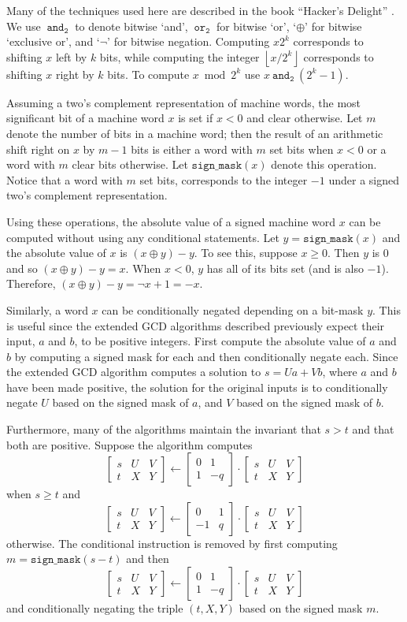 \documentclass{ucalgthes1}
\theoremstyle{definition}
\newcommand{\matrixtt}[4]{\left[ \begin{array}{rr} #1 & #2 \\ #3 & #4 \end{array} \right]}
\newcommand{\matrixThreeTwo}[6]{\left[ \begin{array}{rrr} #1 & #2 & #3 \\ #4 & #5 & #6 \end{array} \right]}
\newcommand{\floor}[1]{\left\lfloor #1 \right\rfloor}
\newcommand{\band}{~\texttt{and}_\texttt{2}~}
\newcommand{\bor}{~\texttt{or}_\texttt{2}~}
\newcommand{\bxor}{\oplus}
\newcommand{\bnot}{\lnot}
\begin{document}
Many of the techniques used here are described in the book ``Hacker's Delight'' \cite{Warren2002}.  We use $\band$ to denote bitwise `and', $\bor$ for bitwise `or', `$\bxor$' for bitwise `exclusive or', and `$\bnot$' for bitwise negation.  Computing $x2^k$ corresponds to shifting $x$ left by $k$ bits, while computing the integer $\floor{x / 2^k}$ corresponds to shifting $x$ right by $k$ bits.  To compute $x \bmod 2^k$ use $x \band (2^k-1)$.

Assuming a two's complement representation of machine words, the most significant bit of a machine word $x$ is set if $x < 0$ and clear otherwise.  Let $m$ denote the number of bits in a machine word; then the result of an arithmetic shift right on $x$ by $m-1$ bits is either a word with $m$ set bits when $x < 0$ or a word with $m$ clear bits otherwise.  Let $\texttt{sign\_mask}(x)$ denote this operation.  Notice that a word with $m$ set bits, corresponds to the integer $-1$ under a signed two's complement representation.

Using these operations, the absolute value of a signed machine word $x$ can be computed without using any conditional statements.  Let $y = \texttt{sign\_mask}(x)$ and the absolute value of $x$ is $(x \bxor y) - y$.  To see this, suppose $x \ge 0$.  Then $y$ is 0 and so $(x \bxor y) - y = x$.  When $x < 0$, $y$ has all of its bits set (and is also $-1$).  Therefore, $(x \bxor y) - y = \bnot x + 1 = -x$.

Similarly, a word $x$ can be conditionally negated depending on a bit-mask $y$.  This is useful since the extended GCD algorithms described previously expect their input, $a$ and $b$, to be positive integers.  First compute the absolute value of $a$ and $b$ by computing a signed mask for each and then conditionally negate each.  Since the extended GCD algorithm computes a solution to $s = Ua + Vb$, where $a$ and $b$ have been made positive, the solution for the original inputs is to conditionally negate $U$ based on the signed mask of $a$, and $V$ based on the signed mask of $b$.

Furthermore, many of the algorithms maintain the invariant that $s > t$ and that both are positive.  Suppose the algorithm computes
\[
 \matrixThreeTwo{s}{U}{V}{t}{X}{Y} \gets \matrixtt{0}{1}{1}{-q} \cdot \matrixThreeTwo{s}{U}{V}{t}{X}{Y}
\]
when $s \ge t$ and
\[
\matrixThreeTwo{s}{U}{V}{t}{X}{Y} \gets \matrixtt{0}{1}{-1}{q} \cdot \matrixThreeTwo{s}{U}{V}{t}{X}{Y}
\]
otherwise.  The conditional instruction is removed by first computing $m = \texttt{sign\_mask}(s - t)$ and then 
\[
 \matrixThreeTwo{s}{U}{V}{t}{X}{Y} \gets \matrixtt{0}{1}{1}{-q} \cdot \matrixThreeTwo{s}{U}{V}{t}{X}{Y}
\]
and conditionally negating the triple $(t, X, Y)$ based on the signed mask $m$.
\end{document}
